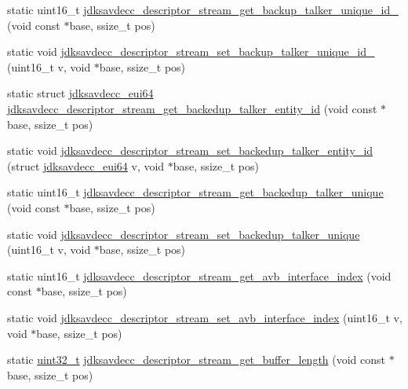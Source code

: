 \begin{DoxyCompactItemize}
\item 
static uint16\+\_\+t \hyperlink{group__descriptor__stream_gac89567fb070ba9e25982371c1934adf7}{jdksavdecc\+\_\+descriptor\+\_\+stream\+\_\+get\+\_\+backup\+\_\+talker\+\_\+unique\+\_\+id\+\_} (void const $\ast$base, ssize\+\_\+t pos)
\item 
static void \hyperlink{group__descriptor__stream_gaa0d22ac68eb83f42655eaeb0072948ec}{jdksavdecc\+\_\+descriptor\+\_\+stream\+\_\+set\+\_\+backup\+\_\+talker\+\_\+unique\+\_\+id\+\_} (uint16\+\_\+t v, void $\ast$base, ssize\+\_\+t pos)
\item 
static struct \hyperlink{structjdksavdecc__eui64}{jdksavdecc\+\_\+eui64} \hyperlink{group__descriptor__stream_ga3e509b00c0913a03e5a5d9fcc658eb53}{jdksavdecc\+\_\+descriptor\+\_\+stream\+\_\+get\+\_\+backedup\+\_\+talker\+\_\+entity\+\_\+id} (void const $\ast$base, ssize\+\_\+t pos)
\item 
static void \hyperlink{group__descriptor__stream_gaf9ded75d56e6999d12dc6b3858e81f88}{jdksavdecc\+\_\+descriptor\+\_\+stream\+\_\+set\+\_\+backedup\+\_\+talker\+\_\+entity\+\_\+id} (struct \hyperlink{structjdksavdecc__eui64}{jdksavdecc\+\_\+eui64} v, void $\ast$base, ssize\+\_\+t pos)
\item 
static uint16\+\_\+t \hyperlink{group__descriptor__stream_ga0004f622f31aa654e913b0f37dc620f6}{jdksavdecc\+\_\+descriptor\+\_\+stream\+\_\+get\+\_\+backedup\+\_\+talker\+\_\+unique} (void const $\ast$base, ssize\+\_\+t pos)
\item 
static void \hyperlink{group__descriptor__stream_gac8d349c9214f43a0a98fa3ab63611398}{jdksavdecc\+\_\+descriptor\+\_\+stream\+\_\+set\+\_\+backedup\+\_\+talker\+\_\+unique} (uint16\+\_\+t v, void $\ast$base, ssize\+\_\+t pos)
\item 
static uint16\+\_\+t \hyperlink{group__descriptor__stream_ga8d7737072e637ae7ba6c607e9907893a}{jdksavdecc\+\_\+descriptor\+\_\+stream\+\_\+get\+\_\+avb\+\_\+interface\+\_\+index} (void const $\ast$base, ssize\+\_\+t pos)
\item 
static void \hyperlink{group__descriptor__stream_gad9f3d6db7080c05fd218dbba1d501c00}{jdksavdecc\+\_\+descriptor\+\_\+stream\+\_\+set\+\_\+avb\+\_\+interface\+\_\+index} (uint16\+\_\+t v, void $\ast$base, ssize\+\_\+t pos)
\item 
static \hyperlink{parse_8c_a6eb1e68cc391dd753bc8ce896dbb8315}{uint32\+\_\+t} \hyperlink{group__descriptor__stream_ga21c0239d391fb8724d6f025ab90e0263}{jdksavdecc\+\_\+descriptor\+\_\+stream\+\_\+get\+\_\+buffer\+\_\+length} (void const $\ast$base, ssize\+\_\+t pos)

\end{DoxyCompactItemize}
